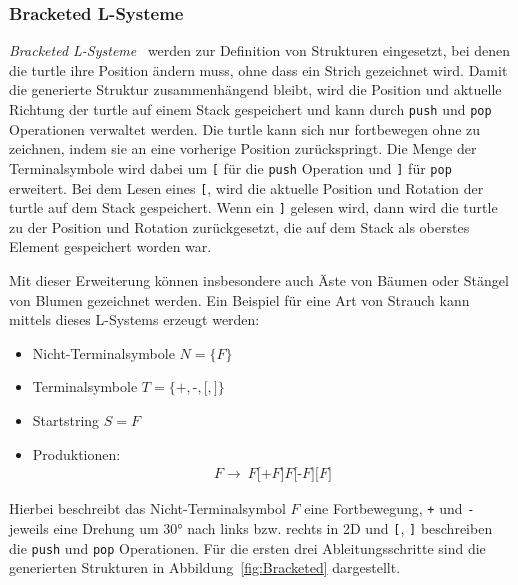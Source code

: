 \subsubsection{Bracketed L-Systeme}
\emph{Bracketed L-Systeme}~\cite*{Shaker2016} werden zur Definition von Strukturen eingesetzt, bei denen die turtle ihre Position ändern muss, ohne dass ein Strich gezeichnet wird.
Damit die generierte Struktur zusammenhängend bleibt, wird die Position und aktuelle Richtung der turtle auf einem Stack gespeichert und kann durch \texttt{push} und \texttt{pop} Operationen verwaltet werden.
Die turtle kann sich nur fortbewegen ohne zu zeichnen, indem sie an eine vorherige Position zurückspringt.
Die Menge der Terminalsymbole wird dabei um \texttt{[} für die \texttt{push} Operation und \texttt{]} für \texttt{pop} erweitert.
Bei dem Lesen eines \texttt{[}, wird die aktuelle Position und Rotation der turtle auf dem Stack gespeichert.
Wenn ein \texttt{]} gelesen wird, dann wird die turtle zu der Position und Rotation zurückgesetzt, die auf dem Stack als oberstes Element gespeichert worden war.

Mit dieser Erweiterung können insbesondere auch Äste von Bäumen oder Stängel von Blumen gezeichnet werden.
Ein Beispiel für eine Art von Strauch kann mittels dieses L-Systems erzeugt werden:
\begin{itemize}
    \item Nicht-Terminalsymbole $N=\{F\}$
    \item Terminalsymbole $T=\{\texttt{+},\texttt{-},\texttt{[},\texttt{]}\}$
    \item Startstring $S=F$
    \item Produktionen:
          \begin{align*}
              F\rightarrow~F\texttt{[+}F\texttt{]}F\texttt{[-}F\texttt{]}\texttt{[}F\texttt{]}
          \end{align*}
\end{itemize}

Hierbei beschreibt das Nicht-Terminalsymbol $F$ eine Fortbewegung, \texttt{+} und \texttt{-} jeweils eine Drehung um \ang{30} nach links bzw. rechts in 2D und \texttt{[}, \texttt{]} beschreiben die \texttt{push} und \texttt{pop} Operationen.
Für die ersten drei Ableitungsschritte sind die generierten Strukturen in Abbildung~\ref{fig:Bracketed} dargestellt.

